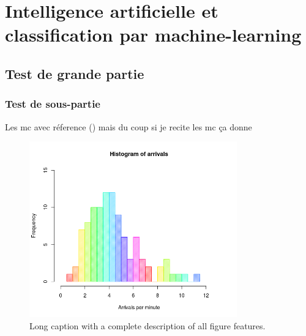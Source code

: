 \chapter{Intelligence artificielle et classification par machine-learning}
\section{Test de grande partie}
\subsection{Test de sous-partie}
Les \gls{mc} avec réference (\cite{habehh_machine_2021}) mais du coup si je recite les \gls{mc} ça donne
\begin{figure}[htbp]
  \centering
  \includegraphics[width=0.8\textwidth]{figures/figure1.png}
  \caption[Short caption]{Long caption with a complete description of all figure features.}
  \label{fig:figure-label}
\end{figure}